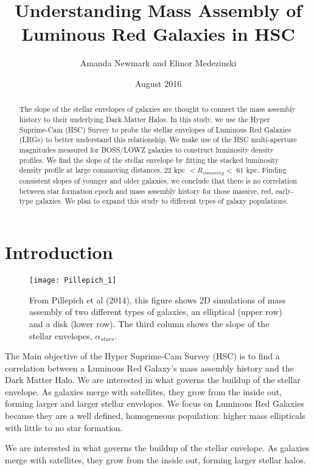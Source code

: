 \documentclass{article}
\title{Understanding Mass Assembly of Luminous Red Galaxies in HSC}
\author{Amanda Newmark and Elinor Medezinski}
\date{August 2016}
\begin{document}
\begin{titlepage}
\maketitle
\end{titlepage}

\begin{abstract}
The slope of the stellar envelopes of galaxies are thought to connect the mass assembly history to their underlying Dark Matter Halos. In this study, we use the Hyper Suprime-Cam (HSC) Survey to probe the stellar envelopes of Luminous Red Galaxies (LRGs) to better understand this relationship. We make use of the HSC multi-aperture magnitudes measured for BOSS/LOWZ galaxies to construct luminosity density profiles. We find the slope of the stellar envelope by fitting the stacked luminosity density profile at large commoving distances, 22 kpc $< R_{comoving} <$ 61 kpc. Finding consistent slopes of younger and older galaxies, we conclude that there is no correlation between star formation epoch and mass assembly history for those massive, red, early-type galaxies. We plan to expand this study to different types of galaxy populations.
\end{abstract}

\tableofcontents{}
\section{Introduction}
\begin{figure}[h!]
\centering
\texttt{[image: Pillepich\_1]}
\caption{From Pillepich et al (2014), this figure shows 2D simulations of mass assembly of two different types of galaxies, an elliptical (upper row) and a disk (lower row). The third column shows the slope of the stellar envelopes, $\alpha_{stars}$.}
\label{fig:meshaaa}
\end{figure}

The Main objective of the Hyper Suprime-Cam Survey (HSC) is to find a correlation between a Luminous Red Galaxy's mass assembly history and the Dark Matter Halo. We are interested in what governs the buildup of the stellar envelope. As galaxies merge with satellites, they grow from the inside out, forming larger and larger stellar envelopes. We focus on Luminous Red Galaxies because they are a well defined, homogeneous population: higher mass ellipticals with little to no star formation.

We are interested in what governs the buildup of the stellar envelope. As galaxies merge with satellites, they grow from the inside out, forming larger stellar halos.
\end{document}
